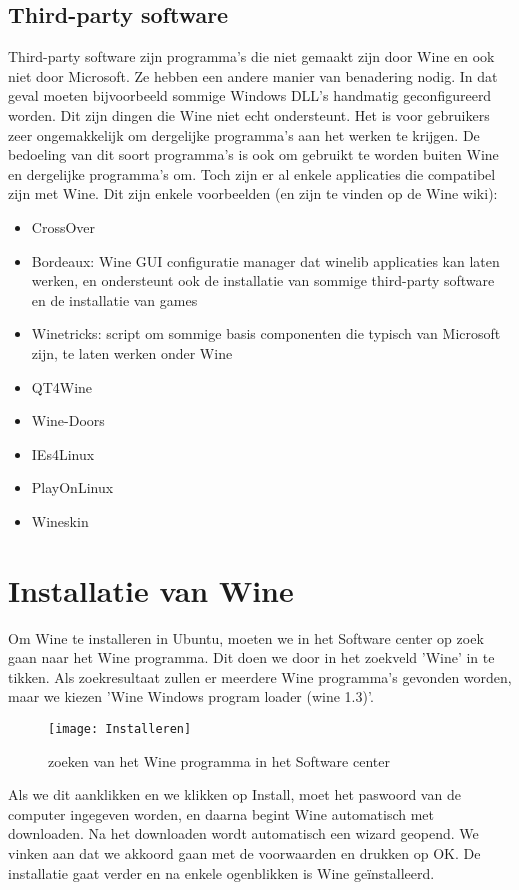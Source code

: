 \documentclass[12pt]{article}
\begin{document}
\subsection{Third-party software}
Third-party software zijn programma's die niet gemaakt zijn door Wine en ook niet door Microsoft. Ze hebben een andere manier van benadering nodig. In dat geval moeten bijvoorbeeld sommige Windows DLL's handmatig geconfigureerd worden. Dit zijn dingen die Wine niet echt ondersteunt. Het is voor gebruikers zeer ongemakkelijk om dergelijke programma's aan het werken te krijgen. De bedoeling van dit soort programma's is ook om gebruikt te 
worden buiten Wine en dergelijke programma's om. Toch zijn er al enkele applicaties die compatibel zijn met Wine. Dit zijn enkele voorbeelden (en zijn te vinden op de Wine wiki): 
\begin{itemize}
	\item CrossOver
	\item Bordeaux: Wine GUI configuratie manager dat winelib applicaties kan laten werken, en ondersteunt ook de installatie van sommige third-party software en de installatie van games
	\item Winetricks: script om sommige basis componenten die typisch van Microsoft zijn, te laten werken onder Wine
	\item QT4Wine
	\item Wine-Doors
	\item IEs4Linux
	\item PlayOnLinux
	\item Wineskin
\end{itemize}
\newpage
\section{Installatie van Wine}
Om Wine te installeren in Ubuntu, moeten we in het Software center op zoek gaan naar het Wine programma. Dit doen we door in het zoekveld 'Wine' in te tikken. Als zoekresultaat zullen er meerdere Wine programma's gevonden worden, maar we kiezen 'Wine Windows program loader (wine 1.3)'.
\begin{figure} [!ht]
\begin{center}
	\texttt{[image: Installeren]}
\end{center}
	\caption{zoeken van het Wine programma in het Software center}
\end{figure}

Als we dit aanklikken en we klikken op Install, moet het paswoord van de computer ingegeven worden, en daarna begint Wine automatisch met downloaden.
\newpage
Na het downloaden wordt automatisch een wizard geopend. We vinken aan dat we akkoord gaan met de voorwaarden en drukken op OK. De installatie gaat verder en na enkele ogenblikken is Wine geïnstalleerd.
\end{document}
